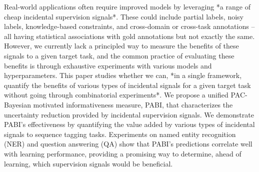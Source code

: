 Real-world applications often require improved models by leveraging *a range of cheap incidental supervision signals*. These could include partial labels, noisy labels, knowledge-based constraints, and cross-domain or cross-task annotations -- all having statistical associations with gold annotations but not exactly the same. However, we currently lack a principled way to measure the benefits of these signals to a given target task, and the common practice of evaluating these benefits is through exhaustive experiments with various models and hyperparameters. This paper studies whether we can, *in a single framework, quantify the benefits of various types of incidental signals for a given target task without going through combinatorial experiments*. We propose a unified PAC-Bayesian motivated informativeness measure, PABI, that characterizes the uncertainty reduction provided by incidental supervision signals. We demonstrate PABI's effectiveness by quantifying the value added by various types of incidental signals to sequence tagging tasks. Experiments on named entity recognition (NER) and question answering (QA) show that PABI's predictions correlate well with learning performance, providing a promising way to determine, ahead of learning, which supervision signals would be beneficial.
